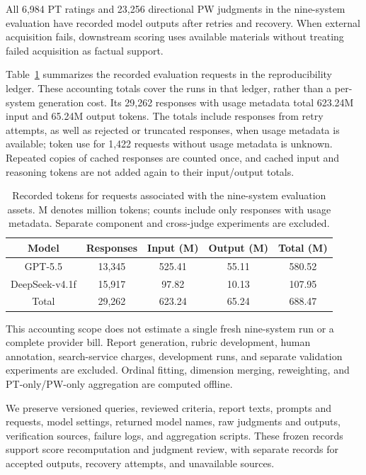 \documentclass{article}
\begin{document}
All 6,984 PT ratings and 23,256 directional PW judgments in the nine-system evaluation have recorded model outputs after retries and recovery. When external acquisition fails, downstream scoring uses available materials without treating failed acquisition as factual support.

Table~\ref{tab:token_usage} summarizes the recorded evaluation requests in the reproducibility ledger. These accounting totals cover the runs in that ledger, rather than a per-system generation cost. Its 29,262 responses with usage metadata total 623.24M input and 65.24M output tokens. The totals include responses from retry attempts, as well as rejected or truncated responses, when usage metadata is available; token use for 1,422 requests without usage metadata is unknown. Repeated copies of cached responses are counted once, and cached input and reasoning tokens are not added again to their input/output totals.

\begin{table}[t]
\centering
\small
\setlength{\tabcolsep}{6pt}


\begin{tabular}{@{}ccccc@{}}
\toprule
Model & Responses & Input (M) & Output (M) & Total (M) \\
\midrule
GPT-5.5 & 13,345 & 525.41 & 55.11 & 580.52 \\
DeepSeek-v4.1f & 15,917 & 97.82 & 10.13 & 107.95 \\
\midrule
Total & 29,262 & 623.24 & 65.24 & 688.47 \\
\bottomrule
\end{tabular}
\caption{Recorded tokens for requests associated with the nine-system evaluation assets. M denotes million tokens; counts include only responses with usage metadata. Separate component and cross-judge experiments are excluded.}
\label{tab:token_usage}
\end{table}

This accounting scope does not estimate a single fresh nine-system run or a complete provider bill. Report generation, rubric development, human annotation, search-service charges, development runs, and separate validation experiments are excluded. Ordinal fitting, dimension merging, reweighting, and PT-only/PW-only aggregation are computed offline.

We preserve versioned queries, reviewed criteria, report texts, prompts and requests, model settings, returned model names, raw judgments and outputs, verification sources, failure logs, and aggregation scripts. These frozen records support score recomputation and judgment review, with separate records for accepted outputs, recovery attempts, and unavailable sources.
\end{document}
